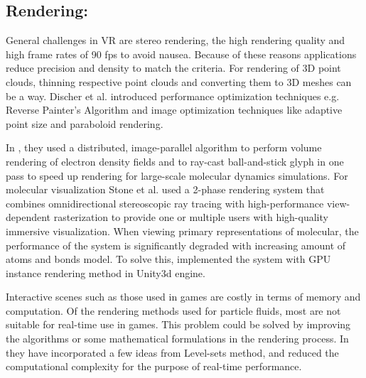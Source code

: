 \documentclass[10pt,twocolumn,letterpaper]{article}
\begin{document}
\subsection{Rendering:}
General challenges in VR are stereo rendering, the high rendering quality and high frame rates of 90 fps to avoid nausea. Because of these reasons applications reduce precision and density to match the criteria. For rendering of 3D point clouds, thinning respective point clouds \cite{peters2016robust} and converting them to 3D meshes \cite{berger2017survey} can be a way. Discher et al. \cite{discher_point-based_2018} introduced performance optimization techniques e.g. Reverse Painter’s Algorithm and image optimization techniques like adaptive point size and paraboloid rendering. 

 In \cite{reda_visualizing_2013}, they used a distributed, image-parallel algorithm to perform volume rendering of electron density fields and to ray-cast ball-and-stick glyph in one pass to speed up rendering for large-scale molecular dynamics simulations. For molecular visualization Stone et al. \cite{stone_immersive_2016} used a 2-phase rendering system that combines omnidirectional stereoscopic ray tracing with high-performance view-dependent rasterization to provide one or multiple users with high-quality immersive visualization. When viewing primary representations of molecular, the performance of the system is significantly degraded with increasing amount of atoms and bonds model. To solve this, \cite{Wiebrands2018} implemented the system with GPU instance rendering method in Unity3d engine. 

Interactive scenes such as those used in games are costly in terms of memory and computation. Of the rendering methods used for particle fluids, most are not suitable for real-time use in games. This problem could be solved by improving the algorithms or some mathematical formulations in the rendering process. In \cite{VanderLaan2009} they have incorporated a few ideas from Level-sets method, and reduced the computational complexity for the purpose of real-time performance.



\end{document}
